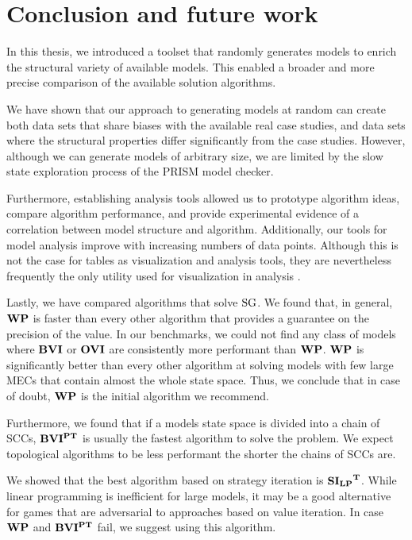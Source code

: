 \chapter{Conclusion and future work} \label{ch:conclusion}
In this thesis, we introduced a toolset that randomly generates models to enrich the structural variety of available models.
This enabled a broader and more precise comparison of the available solution algorithms.

We have shown that our approach to generating models at random can create both data sets that share biases with the available real case studies, 
and data sets where the structural properties differ significantly from the case studies.
However, although we can generate models of arbitrary size, we are limited by the slow state exploration process of the PRISM model checker. 

Furthermore, establishing analysis tools allowed us to prototype algorithm ideas, compare algorithm performance, 
and provide experimental evidence of a correlation between model structure and algorithm. 
Additionally, our tools for model analysis improve with increasing numbers of data points.
Although this is not the case for tables as visualization and analysis tools, 
they are nevertheless frequently the only utility used for visualization in analysis \cite{paperMaxi,widestPath,learningBased}.

Lastly, we have compared algorithms that solve $\textrm{SG}$.
We found that, in general, $\mathbf{WP}$ is faster than every other algorithm that provides a guarantee on the precision of the value.
In our benchmarks, we could not find any class of models where $\mathbf{BVI}$ or $\mathbf{OVI}$ are consistently more performant than $\mathbf{WP}$.
$\mathbf{WP}$ is significantly better than every other algorithm at solving models with few large MECs that contain almost the whole state space.
Thus, we conclude that in case of doubt, $\mathbf{WP}$ is the initial algorithm we recommend.

Furthermore, we found that if a models state space is divided into a chain of SCCs, 
$\mathbf{BVI^{PT}}$ is usually the fastest algorithm to solve the problem.
We expect topological algorithms to be less performant the shorter the chains of SCCs are.

We showed that the best algorithm based on strategy iteration is $\mathbf{\mathbf{SI_{LP}}^T}$.
While linear programming is inefficient for large models, 
it may be a good alternative for games that are adversarial to approaches based on value iteration.
In case $\mathbf{WP}$ and $\mathbf{BVI^{PT}}$ fail, we suggest using this algorithm.


